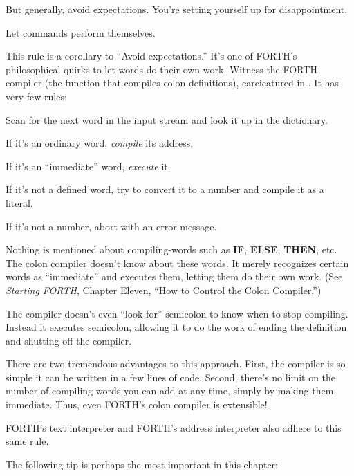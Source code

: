 But generally, avoid expectations. You're setting yourself up for
disappointment.

\begin{tip}
Let commands perform themselves.
\end{tip}

This rule is a corollary to ``Avoid expectations.'' It's one of
FORTH's philosophical quirks to let words do their own work. Witness
the FORTH compiler (the function that compiles colon definitions),
carcicatured in . It has very few rules:



\begin{tfquot}
Scan for the next word in the input stream and look it up in the dictionary.

If it's an ordinary word, \emph{compile} its address.

If it's an ``immediate'' word, \emph{execute} it.

If it's not a defined word, try to convert it to a number and compile it as a
literal.

If it's not a number, abort with an error message.
\end{tfquot}
Nothing is mentioned about compiling-words such as \textbf{IF}, \textbf{ELSE},
\textbf{THEN}, etc. The colon compiler doesn't know about these words. It merely
recognizes certain words as ``immediate'' and executes them, letting
them do their own work. (See \emph{Starting FORTH}, Chapter Eleven, ``How to
Control the Colon Compiler.'')

The compiler doesn't even ``look for'' semicolon to know when to
stop compiling. Instead it executes semicolon, allowing it to do the work
of ending the definition and shutting off the compiler.

There are two tremendous advantages to this approach. First, the
compiler is so simple it can be written in a few lines of code. Second,
there's no limit on the number of compiling words you can add at any
time, simply by making them immediate. Thus, even FORTH's colon
compiler is extensible!

FORTH's text interpreter and FORTH's address interpreter also
adhere to this same rule.

The following tip is perhaps the most important in this chapter:

